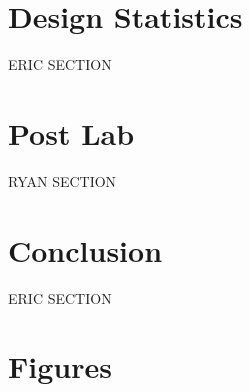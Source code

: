 \documentclass[journal, twocolumn, final,11pt,letterpaper]{IEEEtran}
\begin{document}
\section{Design Statistics}
ERIC SECTION

\section{Post Lab}
RYAN SECTION

\section{Conclusion}
ERIC SECTION

\clearpage
\onecolumn
\section{Figures}


\end{document}
